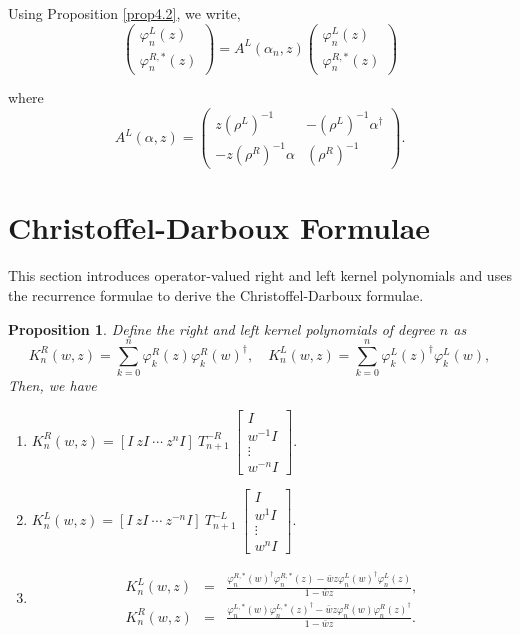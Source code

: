 \documentclass[11pt]{article}
\newtheorem{prop}{Proposition}[section]
\begin{document}
\noindent Using Proposition \ref{prop4.2}, we write,  
\begin{equation} \label{eq:recurrence_matrix}
      \begin{pmatrix}
        \varphi_{n}^{L}(z) \\
        \varphi_{n}^{R,*}(z) 
        \end{pmatrix}= A^{L}(\alpha_{n},z)\begin{pmatrix}
        \varphi_{n}^{L}(z) \\
        \varphi_{n}^{R,*}(z) 
      \end{pmatrix}
\end{equation}

where
\begin{equation} \label{eq:recurrence_inv_matrix}
A^{L}(\alpha,z) = \begin{pmatrix}
z(\rho^{L})^{-1} & -(\rho^{L})^{-1} \alpha^{\dag}\\
-z(\rho^{R})^{-1} \alpha & (\rho^{R})^{-1}
\end{pmatrix}.
\end{equation}


\section{Christoffel-Darboux Formulae}

This section introduces operator-valued right and left kernel polynomials and uses the recurrence formulae to derive the Christoffel-Darboux formulae. 

\begin{prop}\label{prop_kernelCD}
Define the right and left kernel polynomials of degree $n$ as
$$K_{n}^{R}(w,z) = \sum_{k=0}^{n}\varphi_{k}^{R}(z)\varphi_{k}^{R}(w)^{\dag} ,\quad K_{n}^{L}(w,z) = \sum_{k=0}^{n}\varphi_{k}^{L}(z)^{\dag}\varphi_{k}^{L}(w),$$
Then, we have
\begin{enumerate}
\item
$
K_{n}^{R}(w,z)=[I ~ zI ~\cdots ~ z^{n}I]~T_{n+1}^{-R}~\begin{bmatrix}
I \\
w^{-1}I \\
\vdots \\
w^{-n}I
\end{bmatrix}.
$
\item 
$
K_{n}^{L}(w,z)=[I ~ zI ~\cdots ~ z^{-n}I]~T_{n+1}^{-L}~\begin{bmatrix}
I \\
w^{1}I \\
\vdots \\
w^{n}I
\end{bmatrix}.
$
\item \begin{align} \label{cd_right}
K_{n}^{L}(w,z) &=&\frac{\varphi_{n}^{R,*}(w)^{\dag}\varphi_{n}^{R,*}(z) - \bar{w}z\varphi_{n}^{L}(w)^{\dag}\varphi_{n}^{L}(z)}{1-\bar{w}z}, \\ 
\label{cd_left}
K_{n}^{R}(w,z) &=&\frac{\varphi_{n}^{L,*}(w)\varphi_{n}^{L,*}(z)^{\dag} - \bar{w}z\varphi_{n}^{R}(w)\varphi_{n}^{R}(z)^{\dag}}{1-\bar{w}z}. 
\end{align}
\end{enumerate}
\end{prop}
\end{document}
